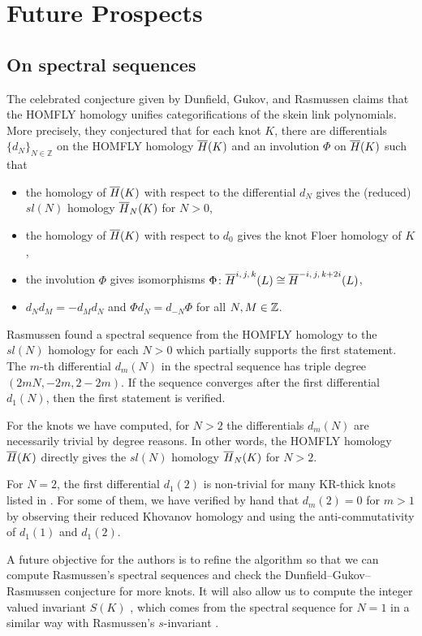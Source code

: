 \section{Future Prospects}\label{sec:future}

\subsection{On spectral sequences}
The celebrated conjecture given by Dunfield, Gukov, and Rasmussen \cite{DGR} claims that the HOMFLY homology unifies categorifications of the skein link polynomials. 
More precisely, they conjectured that for each knot $K$, there are differentials $\{d_N\}_{N \in \mathbb{Z}}$ on the HOMFLY homology $\overline{H}(K)$ and an involution $\Phi$ on $\overline{H}(K)$ such that 
\begin{itemize}
    \item the homology of $\overline{H}(K)$ with respect to the differential $d_N$ gives the (reduced) $sl(N)$ homology $\overline{H}_N(K)$ for $N > 0$,
    \item the homology of $\overline{H}(K)$ with respect to $d_0$ gives the knot Floer homology of $K$,
    \item the involution $\Phi$ gives isomorphisms $\Phi \colon \overline{H}^{i,\,j,\,k}(L) \cong \overline{H}^{-i,\,j,\,k+2i}(L)$, 
    \item $d_Nd_M = -d_Md_N$ and $\Phi d_N = d_{-N}\Phi$ for all $N,M \in \mathbb{Z}$.
\end{itemize}
Rasmussen \cite{Ras15} found a spectral sequence from the HOMFLY homology to the $sl(N)$ homology for each $N > 0$ which partially supports the first statement. 
The $m$-th differential $d_m(N)$ in the spectral sequence has triple degree $(2mN,-2m,2-2m)$. If the sequence converges after the first differential $d_1(N)$, then the first statement is verified. 

For the knots we have computed, for $N > 2$ the differentials $d_m(N)$
are necessarily trivial by degree reasons. In other words, the HOMFLY homology $\overline{H}(K)$ directly gives the $sl(N)$ homology $\overline{H}_N(K)$ for $N > 2$.

For $N = 2$, the first differential $d_1(2)$ is non-trivial for many KR-thick knots listed in .
For some of them, we have verified by hand that $d_m(2) = 0$ for $m > 1$ by observing their reduced Khovanov homology and using the anti-commutativity of $d_1(1)$ and $d_1(2)$.

A future objective for the authors is to refine the algorithm so that we can compute Rasmussen's spectral sequences and check the Dunfield--Gukov--Rasmussen conjecture for more knots. It will also allow us to compute the integer valued invariant $S(K)$ \cite{DGR}, which comes from the spectral sequence for $N = 1$ in a similar way with Rasmussen's $s$-invariant \cite{Rasmussen:2010}.

